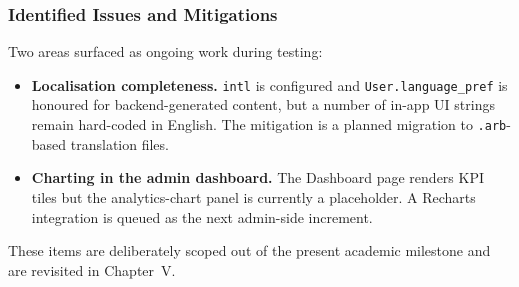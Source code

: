 \subsubsection*{Identified Issues and Mitigations}

Two areas surfaced as ongoing work during testing:

\begin{itemize}
  \item \textbf{Localisation completeness.} \texttt{intl} is configured and \texttt{User.language\_pref} is honoured for backend-generated content, but a number of in-app UI strings remain hard-coded in English. The mitigation is a planned migration to \texttt{.arb}-based translation files.
  \item \textbf{Charting in the admin dashboard.} The Dashboard page renders KPI tiles but the analytics-chart panel is currently a placeholder. A Recharts integration is queued as the next admin-side increment.
\end{itemize}

These items are deliberately scoped out of the present academic milestone and are revisited in Chapter~V.
